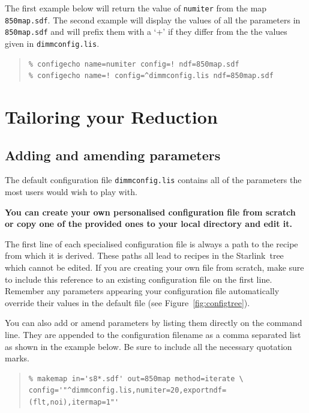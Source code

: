 \documentclass[twoside,11pt]{article}
\newcommand{\htmladdnormallink}[2]{#1}
\newcommand{\htmlref}[2]{#1}
\newcommand{\latexhtml}[2]{#1}
\newcommand{\xlabel}[1]{}
\renewcommand{\_}{\texttt{\symbol{95}}}
\newenvironment{myquote}{\begin{quote}\begin{small}}{\end{small}\end{quote}}
\newcommand{\starlink}{\htmladdnormallink{Starlink}{http://starlink.jach.hawaii.edu}}
\newcommand{\cref}[3]{\latexhtml{#1~\ref{#2}}{\htmlref{#3}{#2}}}
\begin{document}
The first example below will return the value of \texttt{numiter} from
the map \texttt{850map.sdf}. The second example will display the values of all
the parameters in \texttt{850map.sdf} and will prefix them with a `+' if they
differ from the the values given in \texttt{dimmconfig.lis}.

\begin{myquote}
\begin{verbatim}
% configecho name=numiter config=! ndf=850map.sdf
% configecho name=! config=^dimmconfig.lis ndf=850map.sdf
\end{verbatim}
\end{myquote}


\clearpage
\section{\xlabel{tweak}Tailoring your Reduction}
\label{sec:tweak}


\subsection{ Adding and amending parameters}
The default configuration file \texttt{dimmconfig.lis} contains all of
the parameters the most users would wish to play with.

\textbf{You can create your own personalised configuration file from
scratch or copy one of the provided ones to your local directory and
edit it.}

The first line of each specialised configuration file is always a path
to the recipe from which it is derived. These paths all lead to
recipes in the \starlink\ tree which cannot be edited. If you are
creating your own file from scratch, make sure to include this
reference to an existing configuration file on the first line.
Remember any parameters appearing your configuration file
automatically override their values in the default file (see
\cref{Figure}{fig:configtree}{this figure}).

You can also add or amend parameters by listing them directly on the
command line. They are appended to the configuration filename as a
comma separated list as shown in the example below. Be sure to include
all the necessary quotation marks.

\begin{myquote}
\begin{verbatim}
% makemap in='s8*.sdf' out=850map method=iterate \
config='"^dimmconfig.lis,numiter=20,exportndf=(flt,noi),itermap=1"'
\end{verbatim}
\end{myquote}
\end{document}
